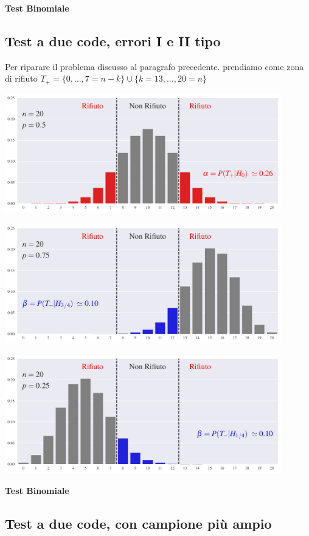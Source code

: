 \documentclass[12pt,openany]{book}
\theoremstyle{mio}
\theoremstyle{liscio}
\begin{document}
\clearpage\hfill\textbf{Test Binomiale}\subsection{Test a due code, errori I e II tipo}

Per riparare il problema discusso al paragrafo precedente. prendiamo come zona di rifiuto $T_+=\{0,\dots,7=n-k\}\cup \{k=13,\dots,20=n\}$

\hfil\includegraphics[width=0.9\textwidth]{figure/B-test_04.pdf}

\hfil\includegraphics[width=0.9\textwidth]{figure/B-test_05.pdf}

\hfil\includegraphics[width=0.9\textwidth]{figure/B-test_06.pdf}




\clearpage\hfill\textbf{Test Binomiale}
\subsection{Test a due code, con campione più ampio}
\end{document}

